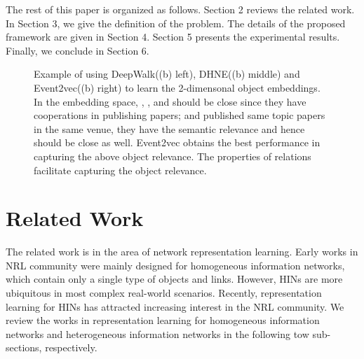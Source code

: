 The rest of this paper is organized as follows. Section 2 reviews the related work. In Section 3, we give the definition of the problem. The details of the proposed framework are given in Section 4. Section 5 presents the experimental results. Finally, we conclude in Section 6.

\begin{figure*}
	\centering
	\caption{{\small Example of using DeepWalk((b) left), DHNE((b) middle) and Event2vec((b) right) to learn the 2-dimensonal object embeddings. In the embedding space, , , and  should be close since they have cooperations in publishing papers;  and  published same topic papers in the same venue, they have the semantic relevance and hence should be close as well. Event2vec obtains the best performance in capturing the above object relevance. The properties of relations facilitate capturing the object relevance.}}\label{figure3}
\end{figure*}

\section{Related Work}
The related work is in the area of network representation learning. Early works in NRL community were mainly designed for homogeneous information networks, which contain only a single type of objects and links. However, HINs are more ubiquitous in most complex real-world scenarios. Recently, representation learning for HINs has attracted increasing interest in the NRL community. We review the works in representation learning for homogeneous information networks and heterogeneous information networks in the following tow sub-sections, respectively.

